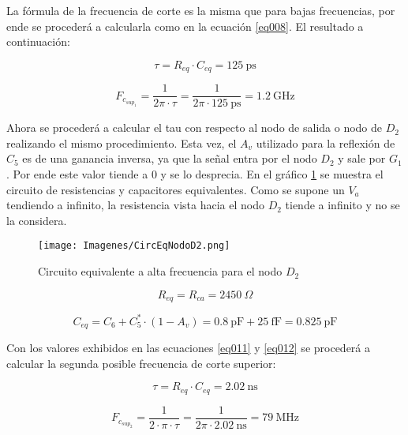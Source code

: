 \documentclass[a4paper,10pt]{article}
\begin{document}
				La fórmula de la frecuencia de corte es la misma que para bajas frecuencias, por ende se procederá a calcularla como en la ecuación 
				\ref{eq008}. El resultado a continuación:
				
				\begin{equation}
					\tau = R_{eq} \cdot C_{eq} = 125~\text{ps}
				\end{equation}

				\begin{equation}
					F_{c_{sup_1}} = \frac{1}{2\pi \cdot \tau} = \frac{1}{2\pi \cdot 125~\text{ps}} = 1.2~\text{GHz}
				\end{equation}
				
				\indent Ahora se procederá a calcular el tau con respecto al nodo de salida o nodo de $D_2$ realizando el mismo procedimiento. Esta vez, 
				el $A_v$ utilizado para la reflexión de $C_5$ es de una ganancia inversa, ya que la señal entra por el nodo $D_2$ y sale por $G_1$. Por ende este 
				valor tiende a 0 y se lo desprecia. En el gráfico \ref{pimg008} se muestra el circuito de resistencias y capacitores equivalentes. Como se 
				supone un $V_a$ tendiendo a infinito, la resistencia vista hacia el nodo $D_2$ tiende a infinito y no se la considera.

				\begin{figure}[!htb]
					\centering
						\texttt{[image: Imagenes/CircEqNodoD2.png]}
						\caption{Circuito equivalente a alta frecuencia para el nodo $D_2$} \label{pimg008}
				\end{figure}

				\begin{equation}
					R_{eq} = R_{ca} = 2450~\Omega \label{eq012}
				\end{equation}
				
				\begin{equation}
					C_{eq} = C_6 + C_5^{*} \cdot (1 - A_v) = 0.8~\text{pF} + 25~\text{fF} = 0.825~\text{pF} \label{eq013}
				\end{equation}
				
				\indent Con los valores exhibidos en las ecuaciones \ref{eq011} y \ref{eq012} se procederá a calcular la segunda posible frecuencia 
				de corte superior:
				
				\begin{equation}
					\tau = R_{eq} \cdot C_{eq} = 2.02~\text{ns}
				\end{equation}

				\begin{equation}
					F_{c_{sup_2}} = \frac{1}{2 \cdot \pi \cdot \tau} = \frac{1}{2\pi \cdot 2.02~\text{ns}} = 79~\text{MHz}
				\end{equation}				
				
\end{document}
